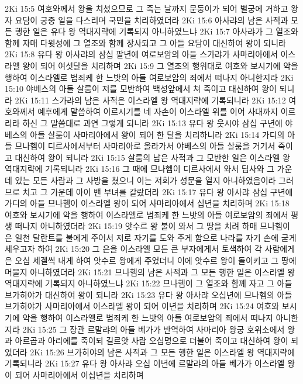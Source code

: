 2Ki 15:5  여호와께서 왕을 치셨으므로 그 죽는 날까지 문둥이가 되어 별궁에 거하고 왕자 요담이 궁중 일을 다스리며 국민을 치리하였더라
2Ki 15:6  아사랴의 남은 사적과 모든 행한 일은 유다 왕 역대지략에 기록되지 아니하였느냐
2Ki 15:7  아사랴가 그 열조와 함께 자매 다윗성에 그 열조와 함께 장사되고 그 아들 요담이 대신하여 왕이 되니라
2Ki 15:8  유다 왕 아사랴의 삼십 팔년에 여로보암의 아들 스가랴가 사마리아에서 이스라엘 왕이 되어 여섯달을 치리하며
2Ki 15:9  그 열조의 행위대로 여호와 보시기에 악을 행하여 이스라엘로 범죄케 한 느밧의 아들 여로보암의 죄에서 떠나지 아니한지라
2Ki 15:10  야베스의 아들 살룸이 저를 모반하여 백성앞에서 쳐 죽이고 대신하여 왕이 되니라
2Ki 15:11  스가랴의 남은 사적은 이스라엘 왕 역대지략에 기록되니라
2Ki 15:12  여호와께서 예후에게 말씀하여 이르시기를 네 자손이 이스라엘 위를 이어 사대까지 이르리라 하신 그 말씀대로 과연 그렇게 되니라
2Ki 15:13  유다 왕 웃시야 삼십 구년에 야베스의 아들 살룸이 사마리아에서 왕이 되어 한 달을 치리하니라
2Ki 15:14  가디의 아들 므나헴이 디르사에서부터 사마리아로 올라가서 야베스의 아들 살룸을 거기서 죽이고 대신하여 왕이 되니라
2Ki 15:15  살룸의 남은 사적과 그 모반한 일은 이스라엘 왕 역대지략에 기록되니라
2Ki 15:16  그 때에 므나헴이 디르사에서 와서 딥사와 그 가운데 있는 모든 사람과 그 사방을 쳤으니 이는 저희가 성문을 열지 아니하였음이라 그러므로 치고 그 가운데 아이 밴 부녀를 갈랐더라
2Ki 15:17  유다 왕 아사랴 삼십 구년에 가디의 아들 므나헴이 이스라엘 왕이 되어 사마리아에서 십년을 치리하며
2Ki 15:18  여호와 보시기에 악을 행하여 이스라엘로 범죄케 한 느밧의 아들 여로보암의 죄에서 평생 떠나지 아니하였더라
2Ki 15:19  앗수르 왕 불이 와서 그 땅을 치려 하매 므나헴이 은 일천 달란트를 불에게 주어서 저로 자기를 도와 주게 함으로 나라를 자기 손에 굳게 세우고자 하여
2Ki 15:20  그 은을 이스라엘 모든 큰 부자에게서 토색하여 각 사람에게 은 오십 세겔씩 내게 하여 앗수르 왕에게 주었더니 이에 앗수르 왕이 돌이키고 그 땅에 머물지 아니하였더라
2Ki 15:21  므나헴의 남은 사적과 그 모든 행한 일은 이스라엘 왕 역대지략에 기록되지 아니하였느냐
2Ki 15:22  므나헴이 그 열조와 함께 자고 그 아들 브가히야가 대신하여 왕이 되니라
2Ki 15:23  유다 왕 아사랴 오십년에 므나헴의 아들 브가히야가 사마리아에서 이스라엘 왕이 되어 이년을 치리하며
2Ki 15:24  여호와 보시기에 악을 행하여 이스라엘로 범죄케 한 느밧의 아들 여로보암의 죄에서 떠나지 아니한지라
2Ki 15:25  그 장관 르말랴의 아들 베가가 반역하여 사마리아 왕궁 호위소에서 왕과 아르곱과 아리에를 죽이되 길르앗 사람 오십명으로 더불어 죽이고 대신하여 왕이 되었더라
2Ki 15:26  브가히야의 남은 사적과 그 모든 행한 일은 이스라엘 왕 역대지략에 기록되니라
2Ki 15:27  유다 왕 아사랴 오십 이년에 르말랴의 아들 베가가 이스라엘 왕이 되어 사마리아에서 이십년을 치리하며
